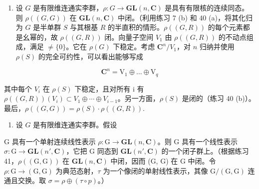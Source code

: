 \begin{enumerate}
\def\labelenumi{\arabic{enumi}.}
\setcounter{enumi}{40}
\tightlist
\item
  设 \(G\) 是有限维连通实李群，\(\rho: G \to \mathbf{GL}(n, \mathbf{C})\) 是具有有限核的连续同态。则 \(\rho((G, G))\) 在 \(\mathbf{GL}(n, \mathbf{C})\) 中闭。（利用练习 7 (b) 和 40 (a)，将其化归为 \(G\) 是半单群 \(S\) 与其根基 \(R\) 的半直积的情形。\(\rho((G, R))\) 的每个元素都是幺幂的，故 \(\rho((G, R))\) 闭。向量子空间 \(V_1\) 由 \(\rho((G, R))\) 的不动点组成，满足 \(\neq \{0\}\)。它在 \(\rho(G)\) 下稳定。考虑 \(\mathbf{C}^n / V_1\)，对 \(n\) 归纳并使用 \(\rho(S)\) 的完全可约性，可以看出能够写成
\end{enumerate}

\[
\mathbf {C} ^ {n} = \mathrm{V} _ {1} \oplus \dots \oplus \mathrm{V} _ {q}
\]

其中每个 \(V_{i}\) 在 \(\rho(S)\) 下稳定，且对所有 i 有 \(\rho((G,R))(V_{i})\subset V_{1}\oplus\cdots\oplus V_{i-1}\)。另一方面，\(\rho(S)\) 是闭的（练习 40 (b)）。最后，\(\rho((G,G))=\rho(S)\cdot\rho((G,R)).\)

\begin{enumerate}
\def\labelenumi{\arabic{enumi}.}
\setcounter{enumi}{41}
\tightlist
\item
  设 \(G\) 是有限维连通实李群。假设
\end{enumerate}

G 具有一个单射连续线性表示 \(\rho: \mathrm{G} \to \mathbf{GL}(n, \mathbf{C})\)。则 G 具有一个线性表示 \(\sigma: \mathrm{G} \to \mathbf{GL}(n', \mathbf{C})\)，它把 G 同态到 \(\mathbf{GL}(n', \mathbf{C})\) 的一个闭子群上。（根据练习 41，\(\rho((\mathrm{G}, \mathrm{G}))\) 在 \(\mathbf{GL}(n, \mathbf{C})\) 中闭，因而 (G, G) 在 G 中闭。令 \(\rho: \mathrm{G} \to (\mathrm{G}, \mathrm{G})\) 为典范态射，\(\tau\) 为一个像闭的单射线性表示，其像 \(\mathrm{G}/(\mathrm{G}, \mathrm{G})\) 连通且交换。取 \(\sigma = \rho \oplus (\tau \circ p)\)。）

